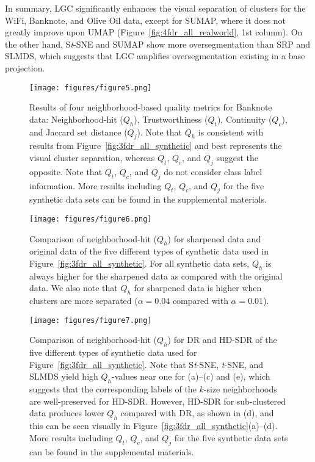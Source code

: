 \documentclass[sagev,Afour,times]{sagej}
\begin{document}
In summary, LGC significantly enhances the visual separation of clusters for the WiFi, Banknote, and Olive Oil data, except for SUMAP, where it does not greatly improve upon UMAP (Figure~\ref{fig:4fdr_all_realworld}, 1st column). On the other hand, S\emph{t}-SNE and SUMAP show more oversegmentation than SRP and SLMDS, which suggests that LGC amplifies oversegmentation existing in a base projection.

\begin{figure*}[htb]
  \centering
  \texttt{[image: figures/figure5.png]}
  \parbox[t]{1\columnwidth}{\relax}
  \caption{\label{fig:5qm_banknote} Results of four neighborhood-based quality metrics for Banknote data: Neighborhood-hit ($Q_h$), Trustworthiness ($Q_t$), Continuity ($Q_c$), and Jaccard set distance ($Q_j$). Note that $Q_h$ is consistent with results from Figure~\ref{fig:3fdr_all_synthetic} and best represents the visual cluster separation, whereas $Q_t$, $Q_c$, and $Q_j$ suggest the opposite. Note that $Q_t$, $Q_c$, and $Q_j$ do not consider class label information. More results including $Q_t$, $Q_c$, and $Q_j$ for the five synthetic data sets can be found in the supplemental materials.}
\end{figure*}

\begin{figure}[htb]
  \centering
  \texttt{[image: figures/figure6.png]}
  \parbox[t]{1\columnwidth}{\relax}
  \caption{\label{fig:6qh_nd_synthetic} Comparison of neighborhood-hit ($Q_h$) for sharpened data and original data of the five different types of synthetic data used in Figure~\ref{fig:3fdr_all_synthetic}. For all synthetic data sets, $Q_h$ is always higher for the sharpened data as compared with the original data. We also note that $Q_h$ for sharpened data is higher when clusters are more separated ($\alpha=0.04$ compared with $\alpha=0.01$).
  }
\end{figure}

\begin{figure}[htb]
  \centering
  \texttt{[image: figures/figure7.png]}
  \parbox[t]{1\columnwidth}{\relax}
  \caption{\label{fig:7qh_2d_synthetic} Comparison of neighborhood-hit ($Q_h$) for DR and HD-SDR of the five different types of synthetic data used for Figure~\ref{fig:3fdr_all_synthetic}. Note that S\emph{t}-SNE, \emph{t}-SNE, and SLMDS yield high $Q_h$-values near one for (a)--(c) and (e), which suggests that the corresponding labels of the $k$-size neighborhoods are well-preserved for HD-SDR. However, HD-SDR for sub-clustered data produces lower $Q_h$ compared with DR, as shown in (d), and this can be seen visually in Figure~\ref{fig:3fdr_all_synthetic}(a)--(d). More results including $Q_t$, $Q_c$, and $Q_j$ for the five synthetic data sets can be found in the supplemental materials.
  }
\end{figure}
\end{document}
